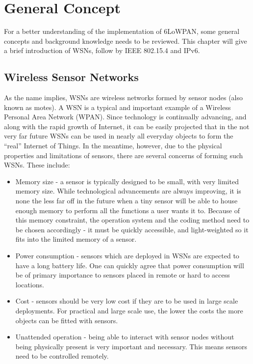 \chapter{General Concept}
\label{General:2.0}
For a better understanding of the implementation of 6LoWPAN, some general concepts and background knowledge needs to be reviewed. This chapter will give a brief introduction of WSNs, follow by IEEE 802.15.4 and IPv6.

\section{Wireless Sensor Networks}
\label{General:WSN}

As the name implies, WSNs are wireless networks formed by sensor
nodes (also known as motes)\@. A WSN is a typical and important example of a Wireless Personal
Area Network (WPAN)\@. Since technology is continually advancing, and along with the rapid growth of Internet, it can be easily projected that in the not very far future WSNs can be used in nearly all everyday objects to form the ``real'' Internet of Things. In the meantime, however, due to the physical properties and limitations of sensors, there are several concerns of forming such WSNs. These include:

\begin{itemize}
\item Memory size - a sensor is typically designed to be small, with very limited memory
size. While technological advancements are always improving, it is none the less far off in the future when a tiny sensor will be able to house enough memory to perform all the functions a user wants it to. Because of this memory constraint, the operation system and the coding method need to be chosen accordingly - it must be quickly accessible, and light-weighted so it fits into the limited memory of a sensor.
\newline

\item Power consumption - sensors which are deployed in WSNs are expected to have a long battery life.  One can quickly agree that power consumption will be of primary importance to sensors placed in remote or hard to access locations.
\newline

\item Cost - sensors should be very low cost if they are to be used in large scale deployments.  For practical and large scale use, the lower the costs the more objects can be fitted with sensors.
\newline

\item  Unattended operation - being able to interact with sensor nodes without being physically
present is very important and necessary.  This means sensors need to be controlled remotely. 
\end{itemize}

